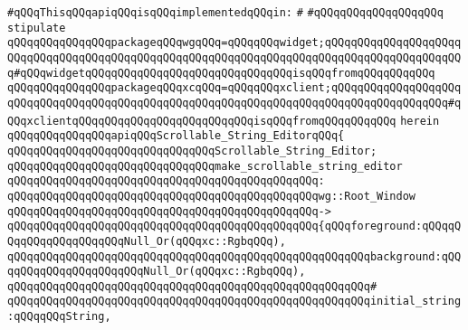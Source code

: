 \verb|#qQQqThisqQQqapiqQQqisqQQqimplementedqQQqin:|\newline
\verb|#|\newline
\verb|#qQQqqQQqqQQqqQQqqQQq|\newline
\newline
\verb|stipulate|\newline
\verb|qQQqqQQqqQQqqQQqpackageqQQqwgqQQq=qQQqqQQqwidget;qQQqqQQqqQQqqQQqqQQqqQQqqQQqqQQqqQQqqQQqqQQqqQQqqQQqqQQqqQQqqQQqqQQqqQQqqQQqqQQqqQQqqQQqqQQq#qQQqwidgetqQQqqQQqqQQqqQQqqQQqqQQqqQQqqQQqisqQQqfromqQQqqQQqqQQq|\newline
\verb|qQQqqQQqqQQqqQQqpackageqQQqxcqQQq=qQQqqQQqxclient;qQQqqQQqqQQqqQQqqQQqqQQqqQQqqQQqqQQqqQQqqQQqqQQqqQQqqQQqqQQqqQQqqQQqqQQqqQQqqQQqqQQqqQQq#qQQqxclientqQQqqQQqqQQqqQQqqQQqqQQqqQQqisqQQqfromqQQqqQQqqQQq|\newline
\verb|herein|\newline
\newline
\verb|qQQqqQQqqQQqqQQqapiqQQqScrollable_String_EditorqQQq{|\newline
\newline
\verb|qQQqqQQqqQQqqQQqqQQqqQQqqQQqqQQqScrollable_String_Editor;|\newline
\newline
\verb|qQQqqQQqqQQqqQQqqQQqqQQqqQQqqQQqmake_scrollable_string_editor|\newline
\verb|qQQqqQQqqQQqqQQqqQQqqQQqqQQqqQQqqQQqqQQqqQQqqQQq:|\newline
\verb|qQQqqQQqqQQqqQQqqQQqqQQqqQQqqQQqqQQqqQQqqQQqqQQqwg::Root_Window|\newline
\verb|qQQqqQQqqQQqqQQqqQQqqQQqqQQqqQQqqQQqqQQqqQQqqQQq->|\newline
\verb|qQQqqQQqqQQqqQQqqQQqqQQqqQQqqQQqqQQqqQQqqQQqqQQq{qQQqforeground:qQQqqQQqqQQqqQQqqQQqqQQqNull_Or(qQQqxc::RgbqQQq),|\newline
\verb|qQQqqQQqqQQqqQQqqQQqqQQqqQQqqQQqqQQqqQQqqQQqqQQqqQQqqQQqbackground:qQQqqQQqqQQqqQQqqQQqqQQqNull_Or(qQQqxc::RgbqQQq),|\newline
\verb|qQQqqQQqqQQqqQQqqQQqqQQqqQQqqQQqqQQqqQQqqQQqqQQqqQQqqQQq#|\newline
\verb|qQQqqQQqqQQqqQQqqQQqqQQqqQQqqQQqqQQqqQQqqQQqqQQqqQQqqQQqinitial_string:qQQqqQQqString,|\newline
